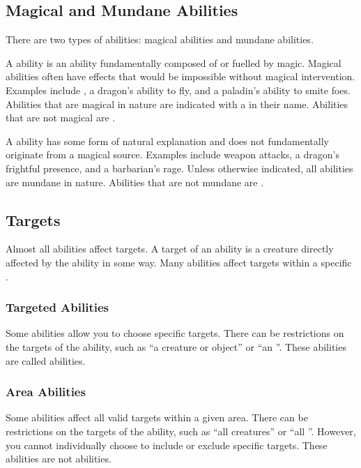  \subsection{Magical and Mundane Abilities}\label{Magical and Mundane Abilities}

    There are two types of abilities: magical abilities and mundane abilities.

     A \magical ability is an ability fundamentally composed of or fuelled by magic.
    Magical abilities often have effects that would be impossible without magical intervention.
    Examples include , a dragon's ability to fly, and a paladin's ability to smite foes.
    Abilities that are magical in nature are indicated with a \sparkle in their name.
    Abilities that are not magical are .

     A  ability has some form of natural explanation and does not fundamentally originate from a magical source.
    Examples include weapon attacks, a dragon's frightful presence, and a barbarian's rage.
    Unless otherwise indicated, all abilities are mundane in nature.
    Abilities that are not mundane are \magical.

  \subsection{Targets}\label{Targets}
    Almost all abilities affect targets.
    A target of an ability is a creature directly affected by the ability in some way.
    Many abilities affect targets within a specific .

    \subsubsection{Targeted Abilities}\label{Targeted Abilities}
      Some abilities allow you to choose specific targets.
      There can be restrictions on the targets of the ability, such as ``a creature or object'' or ``an ''.
      These abilities are called  abilities.

    \subsubsection{Area Abilities}
      Some abilities affect all valid targets within a given area.
      There can be restrictions on the targets of the ability, such as ``all creatures'' or ``all ''.
      However, you cannot individually choose to include or exclude specific targets.
      These abilities are not  abilities.

